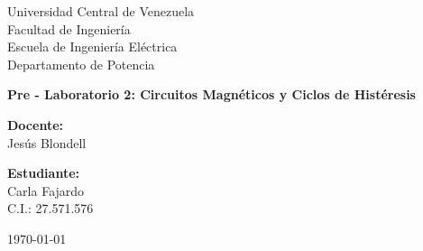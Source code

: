 \begin{titlepage}
    \centering
    \Large
    Universidad Central de Venezuela\\
    Facultad de Ingeniería\\
    Escuela de Ingeniería Eléctrica\\
    Departamento de Potencia
    \vspace*{5.5cm}

    \Huge
    \textbf{Pre - Laboratorio 2: Circuitos Magnéticos y Ciclos de Histéresis}
    \vfill

    \Large
    \begin{minipage}[t]{0.45\textwidth}
        \raggedright
        \textbf{Docente:}\\
        Jesús Blondell
    \end{minipage}%
    \hfill
    \begin{minipage}[t]{0.45\textwidth}
        \raggedleft
        \textbf{Estudiante:}\\
        Carla Fajardo\\
        C.I.: 27.571.576
    \end{minipage}
    \vfill
    \today
\end{titlepage}
